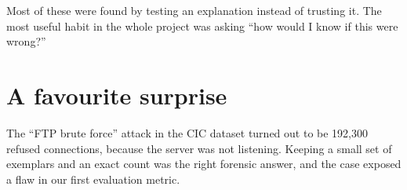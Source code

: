\begin{bigidea}
Most of these were found by testing an explanation instead of trusting it. The most useful habit in the whole project was asking ``how would I know if this were wrong?''
\end{bigidea}

\section{A favourite surprise}
The ``FTP brute force'' attack in the CIC dataset turned out to be 192,300 refused connections, because the server was not listening. Keeping a small set of exemplars and an exact count was the right forensic answer, and the case exposed a flaw in our first evaluation metric.
